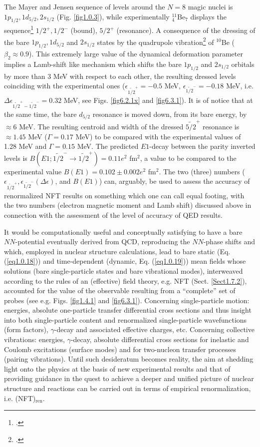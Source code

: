 The Mayer and Jensen sequence of levels around the  $N=8$ magic nuclei is $1p_{1/2},1d_{5/2},2s_{1/2}$ (Fig. \ref{fig1.0.3}), while experimentally $^{11}_{4}$Be$_{7}$ displays the sequence\footnote{\cite{Kwan:14}.} $1/2^+,1/2^-$ (bound), $5/2^+$ (resonance). A consequence of the dressing of the bare $1p_{1/2},1d_{5/2}$ and  $2s_{1/2}$ states by the quadrupole vibration\footnote{\cite{Barranco:17}.} of $^{10}$Be ($\beta_2\approx0.9$). This extremely
large value of the dynamical deformation parameter implies a Lamb-shift like mechanism which shifts the bare $1p_{1/2}$ and $2s_{1/2}$ orbitals by more than 3 MeV with respect to each other, the resulting dressed levels coinciding with the experimental ones ($\epsilon_{\widetilde {1/2}^+}=-0.5$ MeV, $\epsilon_{\widetilde {1/2}^-}=-0.18$ MeV, i.e. $\Delta\epsilon_{\widetilde {1/2}^+-\widetilde {1/2}^-}=0.32$ MeV, see Figs. \ref{fig6.2.1x} and \ref{fig6.3.1}). It is of notice that at the same time, the bare $d_{5/2}$ resonance is moved down, from its bare energy, by $\approx6$ MeV. The resulting centroid and width of the dressed $\widetilde{5/2}^+$ resonance is $\approx1.45$ MeV ($\Gamma=0.17$ MeV) to be compared with the experimental values of 1.28 MeV and $\Gamma=0.15$ MeV. The predicted $E1$-decay between the parity inverted levels is $B(E1;\widetilde{1/2}^-\to\widetilde{1/2}^+)=0.11e^2$ fm$^2$, a value to be compared to the experimental value $B(E1)=0.102\pm0.002e^2$ fm$^2$. The two (three) numbers ($\epsilon_{\widetilde{1/2}^+},\epsilon_{\widetilde {1/2}^-} (\Delta\epsilon)$, and $B(E1)$) can, arguably, be used to assess the accuracy of renormalized NFT results on something which one can call equal footing, with the two numbers (electron magnetic moment and Lamb shift) discussed above in connection with the assessment of the level of accuracy of QED results. 


It would be computationally useful and conceptually satisfying to have a bare $NN$-potential eventually derived from QCD, reproducing the $NN$-phase shifts and which, employed in nuclear structure calculations, lead to bare static (Eq. (\ref{eq1.0.18})) and  time-dependent (dynamic, Eq. (\ref{eq1.0.19})) mean fields whose solutions (bare single-particle states and bare vibrational modes), interweaved according to the rules of an (effective) field theory, e.g. NFT (Sect. \ref{Sect1.7.2}), accounted for the value of the observable resulting from a ``complete'' set of probes (see e.g. Figs. \ref{fig1.4.1} and \ref{fig6.3.1}). Concerning single-particle motion: energies, absolute one-particle transfer differential cross sections and thus insight into both single-particle content and renormalized single-particle wavefunctions (form factors), $\gamma$-decay and associated effective charges, etc. Concerning collective vibrations: energies, $\gamma$-decay, absolute differential cross sections for inelastic and Coulomb excitations (surface modes) and for two-nucleon transfer processes (pairing vibrations).
Until such desideratum becomes reality, the aim at shedding light onto the physics at the basis of new experimental results and that of providing guidance in the quest to achieve a deeper and unified picture of nuclear structure and reactions can be carried out in terms of empirical renormalization, i.e. (NFT)$_{\text{ren}}$.  

